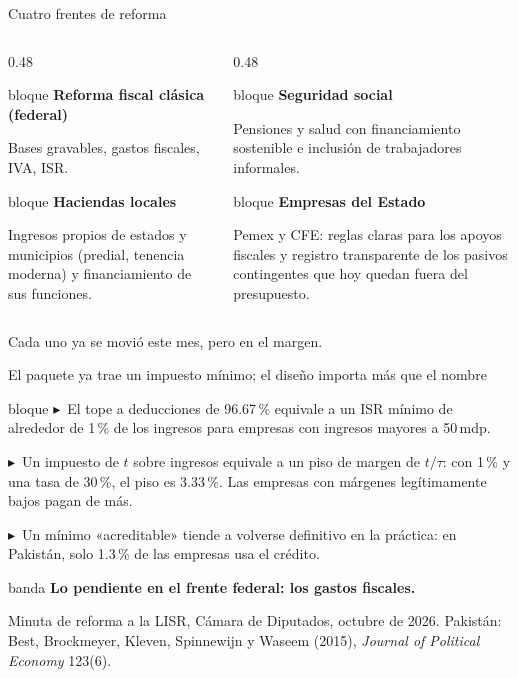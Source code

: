 \documentclass[aspectratio=169,12pt]{beamer}
\newcommand{\frente}[2]{%
    \begin{beamercolorbox}[wd=\linewidth,sep=5pt,rounded=false]{bloque}
      {\color{petroleo}\bfseries #1}\par\vspace{0.2em}\small #2
    \end{beamercolorbox}}
\newcommand{\punto}{{\color{petroleo}$\blacktriangleright$}\ }
\newcommand{\fuente}[1]{\par\vfill{\color{grisclaro}\scriptsize #1}}
\begin{document}
\begin{frame}{Cuatro frentes de reforma}
  \vspace{-0.4em}
  \begin{columns}[T]
    \begin{column}{0.48\textwidth}
      \frente{Reforma fiscal clásica (federal)}{Bases gravables, gastos fiscales, IVA, ISR.}\par\vspace{0.35em}
      \frente{Haciendas locales}{Ingresos propios de estados y municipios (predial, tenencia moderna) y financiamiento de sus funciones.}
    \end{column}
    \begin{column}{0.48\textwidth}
      \frente{Seguridad social}{Pensiones y salud con financiamiento sostenible e inclusión de trabajadores informales.}\par\vspace{0.35em}
      \frente{Empresas del Estado}{Pemex y CFE: reglas claras para los apoyos fiscales y registro transparente de los pasivos contingentes que hoy quedan fuera del presupuesto.}
    \end{column}
  \end{columns}
  \vspace{1.2em}
  {\small Cada uno ya se movió este mes, pero en el margen.\par}
\end{frame}

\begin{frame}{El paquete ya trae un impuesto mínimo; el diseño importa más que el nombre}
  \begin{beamercolorbox}[wd=\linewidth,sep=7pt]{bloque}
    \small\punto El tope a deducciones de 96.67\,\% equivale a un ISR mínimo de alrededor de 1\,\% de los ingresos para empresas con ingresos mayores a 50\,mdp.\par\vspace{0.4em}
    \punto Un impuesto de $t$ sobre ingresos equivale a un piso de margen de $t/\tau$: con 1\,\% y una tasa de 30\,\%, el piso es 3.33\,\%. Las empresas con márgenes legítimamente bajos pagan de más.\par\vspace{0.4em}
    \punto Un mínimo «acreditable» tiende a volverse definitivo en la práctica: en Pakistán, solo 1.3\,\% de las empresas usa el crédito.
  \end{beamercolorbox}
  \vspace{0.5em}
  \begin{beamercolorbox}[wd=\textwidth,sep=6pt,center]{banda}
    \bfseries Lo pendiente en el frente federal: los gastos fiscales.
  \end{beamercolorbox}
  \fuente{\raggedright Minuta de reforma a la LISR, Cámara de Diputados, octubre de 2026. Pakistán: Best, Brockmeyer, Kleven, Spinnewijn y Waseem (2015), \emph{Journal of Political Economy} 123(6).\par}
\end{frame}
\end{document}
